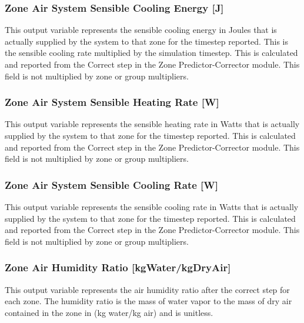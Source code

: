 \subsubsection{Zone Air System Sensible Cooling Energy {[}J{]}}\label{zone-air-system-sensible-cooling-energy-j}

This output variable represents the sensible cooling energy in Joules that is actually supplied by the system to that zone for the timestep reported. This is the sensible cooling rate multiplied by the simulation timestep. This is calculated and reported from the Correct step in the Zone Predictor-Corrector module. This field is not multiplied by zone or group multipliers.

\subsubsection{Zone Air System Sensible Heating Rate {[}W{]}}\label{zone-air-system-sensible-heating-rate-w}

This output variable represents the sensible heating rate in Watts that is actually supplied by the system to that zone for the timestep reported. This is calculated and reported from the Correct step in the Zone Predictor-Corrector module. This field is not multiplied by zone or group multipliers.

\subsubsection{Zone Air System Sensible Cooling Rate {[}W{]}}\label{zone-air-system-sensible-cooling-rate-w}

This output variable represents the sensible cooling rate in Watts that is actually supplied by the system to that zone for the timestep reported. This is calculated and reported from the Correct step in the Zone Predictor-Corrector module. This field is not multiplied by zone or group multipliers.

\subsubsection{Zone Air Humidity Ratio {[}kgWater/kgDryAir{]}}\label{zone-air-humidity-ratio-kgwaterkgdryair}

This output variable represents the air humidity ratio after the correct step for each zone. The humidity ratio is the mass of water vapor to the mass of dry air contained in the zone in (kg water/kg air) and is unitless.


